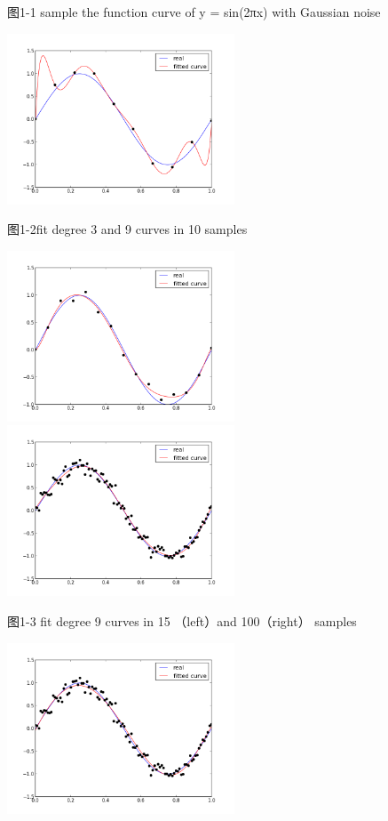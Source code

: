 \documentclass[10pt,a4paper]{article}
\theoremstyle{mythm}%
\numberwithin{equation}{section}
\begin{document}
图1-1 sample the function curve of y = sin(2πx) with Gaussian noise

\includegraphics[height=2in]{figure1-2.png} 

图1-2fit degree 3 and 9 curves in 10 samples

\includegraphics[height=2in]{figure1-3.png} 
\includegraphics[height=2in]{figure1-4.png} 

图1-3 fit degree 9 curves in 15 （left）and 100（right） samples

\includegraphics[height=2in]{figure1-5.png} 
\end{document}
